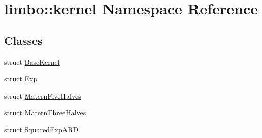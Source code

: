 \hypertarget{namespacelimbo_1_1kernel}{}\section{limbo\+:\+:kernel Namespace Reference}
\label{namespacelimbo_1_1kernel}
\subsection*{Classes}
\begin{DoxyCompactItemize}
\item 
struct \hyperlink{structlimbo_1_1kernel_1_1_base_kernel}{Base\+Kernel}
\item 
struct \hyperlink{structlimbo_1_1kernel_1_1_exp}{Exp}
\item 
struct \hyperlink{structlimbo_1_1kernel_1_1_matern_five_halves}{Matern\+Five\+Halves}
\item 
struct \hyperlink{structlimbo_1_1kernel_1_1_matern_three_halves}{Matern\+Three\+Halves}
\item 
struct \hyperlink{structlimbo_1_1kernel_1_1_squared_exp_a_r_d}{Squared\+Exp\+A\+RD}
\end{DoxyCompactItemize}
